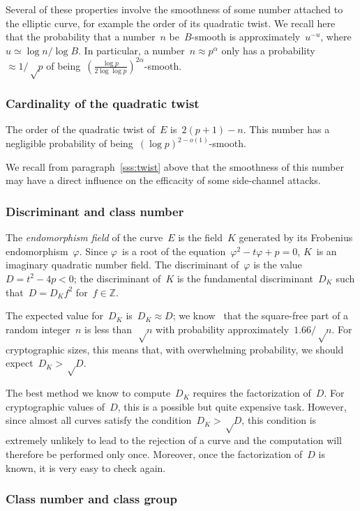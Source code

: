 \documentclass{article}
\begin{document}
Several of these properties involve the smoothness of
some number attached to the elliptic curve,
for example the order of its quadratic twist.
We recall here~\cite{jnt1983cep} that the probability that
a number~$n$ be~$B$-smooth is approximately~$u^{-u}$,
where $u ≃ \log n / \log B$.
In particular, a number~$n ≈ p^{α}$ only has a probability~$≈ 1/√p$
of being~$(\frac{\log p}{2\log\log p})^{2α}$-smooth.

\subsubsection{Cardinality of the quadratic twist}
\label{sss:twist-smooth}

The order of the quadratic twist of~$E$ is~$2(p+1) - n$.
This number has a negligible probability
of being~$(\log p)^{2 - o(1)}$-smooth.

We recall from paragraph~\ref{sss:twist} above
that the smoothness of this number may have a direct influence
on the efficacity of some side-channel attacks.

\subsubsection{Discriminant and class number}
\label{sss:discriminant}

The \emph{endomorphism field} of the curve~$E$
is the field~$K$ generated by its Frobenius endomorphism~$φ$.
Since $φ$~is a root of the equation~$φ^2 - t φ + p = 0$,
$K$~is an imaginary quadratic number field.
The discriminant of~$φ$ is the value~$D = t^2 - 4 p < 0$;
the discriminant of~$K$ is the fundamental discriminant~$D_K$
such that~$D = D_K f^2$ for~$f ∈ ℤ$.

The expected value for~$D_K$ is~$D_K ≈ D$;
we know~\cite{jis2014cdkd} that the square-free part of
a random integer~$n$ is less than~$√n$
with probability approximately~$1.66/√n$.
For cryptographic sizes, this means that,
with overwhelming probability, we should expect~$D_K > √D$.

The best method we know to compute~$D_K$ requires the
factorization of~$D$.
For cryptographic values of~$D$, this is a possible but
quite expensive task.
However, since almost all curves satisfy the condition~$D_K > √D$,
this condition is extremely unlikely to lead to the rejection of a curve
and the computation will therefore be performed only once.
Moreover, once the factorization of~$D$ is known,
it is very easy to check again.

\subsubsection{Class number and class group}
\end{document}
